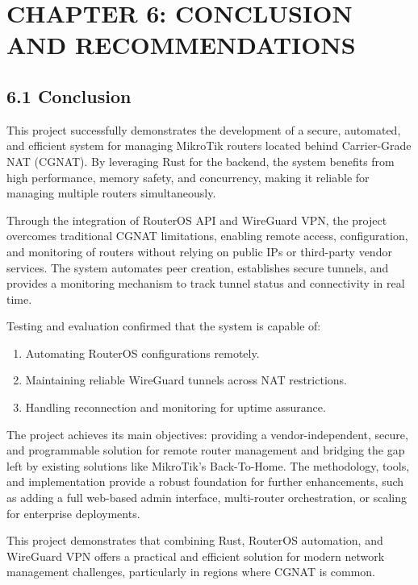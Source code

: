 \documentclass[12pt,a4paper,oneside]{report}
\begin{document}
\chapter{CHAPTER 6: CONCLUSION AND RECOMMENDATIONS}

\section{6.1 Conclusion}

This project successfully demonstrates the development of a secure, automated, and efficient system for managing MikroTik routers located behind Carrier-Grade NAT (CGNAT). By leveraging Rust for the backend, the system benefits from high performance, memory safety, and concurrency, making it reliable for managing multiple routers simultaneously.

Through the integration of RouterOS API and WireGuard VPN, the project overcomes traditional CGNAT limitations, enabling remote access, configuration, and monitoring of routers without relying on public IPs or third-party vendor services. The system automates peer creation, establishes secure tunnels, and provides a monitoring mechanism to track tunnel status and connectivity in real time.

Testing and evaluation confirmed that the system is capable of:

\begin{enumerate}
  \item Automating RouterOS configurations remotely.
  \item Maintaining reliable WireGuard tunnels across NAT restrictions.
  \item Handling reconnection and monitoring for uptime assurance.
\end{enumerate}

The project achieves its main objectives: providing a vendor-independent, secure, and programmable solution for remote router management and bridging the gap left by existing solutions like MikroTik's Back-To-Home. The methodology, tools, and implementation provide a robust foundation for further enhancements, such as adding a full web-based admin interface, multi-router orchestration, or scaling for enterprise deployments.

This project demonstrates that combining Rust, RouterOS automation, and WireGuard VPN offers a practical and efficient solution for modern network management challenges, particularly in regions where CGNAT is common.
\end{document}
